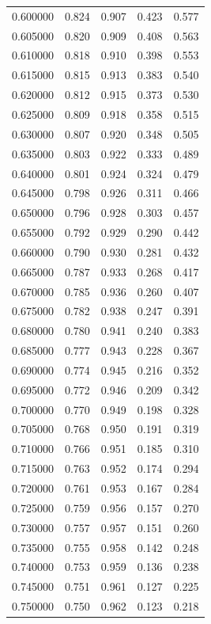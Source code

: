 \begin{table}[htbp]
\begin{tabular}{lllll}
0.600000 & 0.824 & 0.907 & 0.423 & 0.577 \\
0.605000 & 0.820 & 0.909 & 0.408 & 0.563 \\
0.610000 & 0.818 & 0.910 & 0.398 & 0.553 \\
0.615000 & 0.815 & 0.913 & 0.383 & 0.540 \\
0.620000 & 0.812 & 0.915 & 0.373 & 0.530 \\
0.625000 & 0.809 & 0.918 & 0.358 & 0.515 \\
0.630000 & 0.807 & 0.920 & 0.348 & 0.505 \\
0.635000 & 0.803 & 0.922 & 0.333 & 0.489 \\
0.640000 & 0.801 & 0.924 & 0.324 & 0.479 \\
0.645000 & 0.798 & 0.926 & 0.311 & 0.466 \\
0.650000 & 0.796 & 0.928 & 0.303 & 0.457 \\
0.655000 & 0.792 & 0.929 & 0.290 & 0.442 \\
0.660000 & 0.790 & 0.930 & 0.281 & 0.432 \\
0.665000 & 0.787 & 0.933 & 0.268 & 0.417 \\
0.670000 & 0.785 & 0.936 & 0.260 & 0.407 \\
0.675000 & 0.782 & 0.938 & 0.247 & 0.391 \\
0.680000 & 0.780 & 0.941 & 0.240 & 0.383 \\
0.685000 & 0.777 & 0.943 & 0.228 & 0.367 \\
0.690000 & 0.774 & 0.945 & 0.216 & 0.352 \\
0.695000 & 0.772 & 0.946 & 0.209 & 0.342 \\
0.700000 & 0.770 & 0.949 & 0.198 & 0.328 \\
0.705000 & 0.768 & 0.950 & 0.191 & 0.319 \\
0.710000 & 0.766 & 0.951 & 0.185 & 0.310 \\
0.715000 & 0.763 & 0.952 & 0.174 & 0.294 \\
0.720000 & 0.761 & 0.953 & 0.167 & 0.284 \\
0.725000 & 0.759 & 0.956 & 0.157 & 0.270 \\
0.730000 & 0.757 & 0.957 & 0.151 & 0.260 \\
0.735000 & 0.755 & 0.958 & 0.142 & 0.248 \\
0.740000 & 0.753 & 0.959 & 0.136 & 0.238 \\
0.745000 & 0.751 & 0.961 & 0.127 & 0.225 \\
0.750000 & 0.750 & 0.962 & 0.123 & 0.218 \\

\end{tabular}
\end{table}

